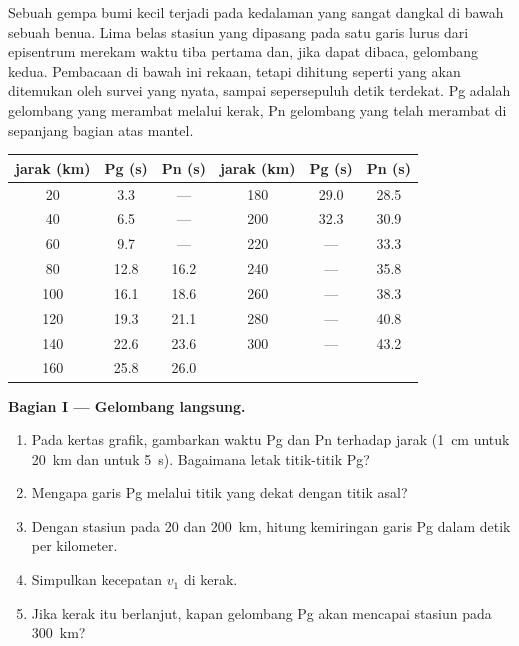 \begin{problem}
\label{pb:g11:seismic-structure:1}
Sebuah gempa bumi kecil terjadi pada kedalaman yang sangat dangkal di bawah
sebuah benua. Lima belas stasiun yang dipasang pada satu garis lurus dari
episentrum merekam waktu tiba  pertama dan, jika dapat dibaca,
gelombang kedua. Pembacaan di bawah ini rekaan, tetapi dihitung seperti yang
akan ditemukan oleh survei yang nyata, sampai sepersepuluh detik terdekat. Pg
adalah gelombang yang merambat melalui kerak, Pn gelombang yang telah merambat
di sepanjang bagian atas mantel.

\begin{center}
\small
\begin{tabular}{|c|c|c||c|c|c|}
\hline
jarak (\unit{km}) & Pg (\unit{s}) & Pn (\unit{s}) & jarak (\unit{km}) & Pg (\unit{s}) & Pn (\unit{s}) \\ \hline
20 & 3.3 & --- & 180 & 29.0 & 28.5 \\ \hline
40 & 6.5 & --- & 200 & 32.3 & 30.9 \\ \hline
60 & 9.7 & --- & 220 & --- & 33.3 \\ \hline
80 & 12.8 & 16.2 & 240 & --- & 35.8 \\ \hline
100 & 16.1 & 18.6 & 260 & --- & 38.3 \\ \hline
120 & 19.3 & 21.1 & 280 & --- & 40.8 \\ \hline
140 & 22.6 & 23.6 & 300 & --- & 43.2 \\ \hline
160 & 25.8 & 26.0 & & & \\ \hline
\end{tabular}
\end{center}

\medskip
\noindent\textbf{Bagian I --- Gelombang langsung.}
\begin{enumerate}
  \item Pada kertas grafik, gambarkan waktu Pg dan Pn terhadap jarak (\qty{1}{cm}
        untuk \qty{20}{km} dan untuk \qty{5}{s}). Bagaimana letak titik-titik Pg?
  \item Mengapa garis Pg melalui titik yang dekat dengan titik asal?
  \item Dengan stasiun pada 20 dan \qty{200}{km}, hitung kemiringan
        garis Pg dalam detik per kilometer.
  \item Simpulkan kecepatan $v_1$  di kerak.
  \item Jika kerak itu berlanjut, kapan gelombang Pg akan mencapai stasiun pada
        \qty{300}{km}?
\end{enumerate}


\end{problem}
